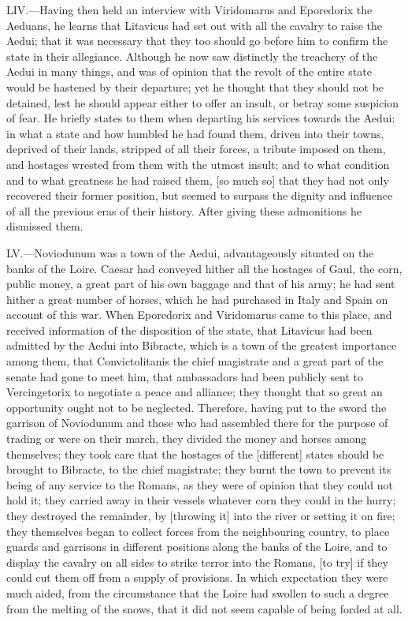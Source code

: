 LIV.—Having then held an interview with Viridomarus and Eporedorix the
Aeduans, he learns that Litavicus had set out with all the cavalry to
raise the Aedui; that it was necessary that they too should go before
him to confirm the state in their allegiance. Although he now saw
distinctly the treachery of the Aedui in many things, and was of opinion
that the revolt of the entire state would be hastened by their
departure; yet he thought that they should not be detained, lest he
should appear either to offer an insult, or betray some suspicion of
fear. He briefly states to them when departing his services towards the
Aedui: in what a state and how humbled he had found them, driven into
their towns, deprived of their lands, stripped of all their forces, a
tribute imposed on them, and hostages wrested from them with the utmost
insult; and to what condition and to what greatness he had raised them,
[so much so] that they had not only recovered their former position, but
seemed to surpass the dignity and influence of all the previous eras of
their history. After giving these admonitions he dismissed them.

LV.—Noviodunum was a town of the Aedui, advantageously situated on the
banks of the Loire. Caesar had conveyed hither all the hostages of Gaul,
the corn, public money, a great part of his own baggage and that of his
army; he had sent hither a great number of horses, which he had
purchased in Italy and Spain on account of this war. When Eporedorix and
Viridomarus came to this place, and received information of the
disposition of the state, that Litavicus had been admitted by the Aedui
into Bibracte, which is a town of the greatest importance among them,
that Convictolitanis the chief magistrate and a great part of the senate
had gone to meet him, that ambassadors had been publicly sent to
Vercingetorix to negotiate a peace and alliance; they thought that so
great an opportunity ought not to be neglected. Therefore, having put to
the sword the garrison of Noviodunum and those who had assembled there
for the purpose of trading or were on their march, they divided the
money and horses among themselves; they took care that the hostages of
the [different] states should be brought to Bibracte, to the chief
magistrate; they burnt the town to prevent its being of any service to
the Romans, as they were of opinion that they could not hold it; they
carried away in their vessels whatever corn they could in the hurry;
they destroyed the remainder, by [throwing it] into the river or setting
it on fire; they themselves began to collect forces from the
neighbouring country, to place guards and garrisons in different
positions along the banks of the Loire, and to display the cavalry on
all sides to strike terror into the Romans, [to try] if they could cut
them off from a supply of provisions. In which expectation they were
much aided, from the circumstance that the Loire had swollen to such a
degree from the melting of the snows, that it did not seem capable of
being forded at all.

